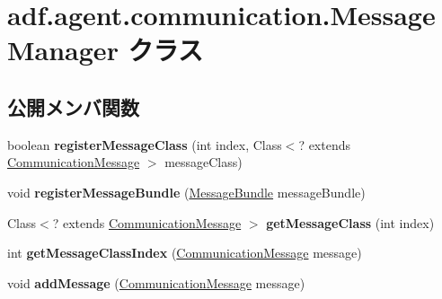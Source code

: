 \hypertarget{classadf_1_1agent_1_1communication_1_1MessageManager}{}\section{adf.\+agent.\+communication.\+Message\+Manager クラス}
\label{classadf_1_1agent_1_1communication_1_1MessageManager}
\subsection*{公開メンバ関数}
\begin{DoxyCompactItemize}
\item 
\hypertarget{classadf_1_1agent_1_1communication_1_1MessageManager_a0f995e8c0da19177190b54e75e50b2ae}{}\label{classadf_1_1agent_1_1communication_1_1MessageManager_a0f995e8c0da19177190b54e75e50b2ae} 
boolean {\bfseries register\+Message\+Class} (int index, Class$<$? extends \hyperlink{classadf_1_1component_1_1communication_1_1CommunicationMessage}{Communication\+Message} $>$ message\+Class)
\item 
\hypertarget{classadf_1_1agent_1_1communication_1_1MessageManager_a6b634d9bdafbcbed7c6c85cde84c09c9}{}\label{classadf_1_1agent_1_1communication_1_1MessageManager_a6b634d9bdafbcbed7c6c85cde84c09c9} 
void {\bfseries register\+Message\+Bundle} (\hyperlink{classadf_1_1component_1_1communication_1_1MessageBundle}{Message\+Bundle} message\+Bundle)
\item 
\hypertarget{classadf_1_1agent_1_1communication_1_1MessageManager_aea47acc4d752be5b0d00669800741801}{}\label{classadf_1_1agent_1_1communication_1_1MessageManager_aea47acc4d752be5b0d00669800741801} 
Class$<$? extends \hyperlink{classadf_1_1component_1_1communication_1_1CommunicationMessage}{Communication\+Message} $>$ {\bfseries get\+Message\+Class} (int index)
\item 
\hypertarget{classadf_1_1agent_1_1communication_1_1MessageManager_a97cd96aafacd7f00d62aabc4c0c831ab}{}\label{classadf_1_1agent_1_1communication_1_1MessageManager_a97cd96aafacd7f00d62aabc4c0c831ab} 
int {\bfseries get\+Message\+Class\+Index} (\hyperlink{classadf_1_1component_1_1communication_1_1CommunicationMessage}{Communication\+Message} message)
\item 
\hypertarget{classadf_1_1agent_1_1communication_1_1MessageManager_a09975b03dd75277e8052b48f68bdec0e}{}\label{classadf_1_1agent_1_1communication_1_1MessageManager_a09975b03dd75277e8052b48f68bdec0e} 
void {\bfseries add\+Message} (\hyperlink{classadf_1_1component_1_1communication_1_1CommunicationMessage}{Communication\+Message} message)

\end{DoxyCompactItemize}
